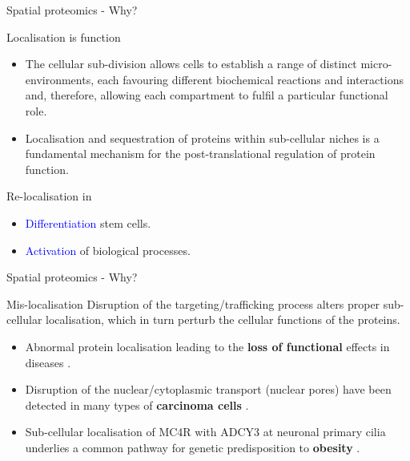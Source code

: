 \begin{frame}{Spatial proteomics - Why?}
  \begin{block}{Localisation is function}
    \begin{itemize}
    \item The cellular sub-division allows cells to establish a range
      of distinct micro-environments, each favouring different
      biochemical reactions and interactions and, therefore, allowing
      each compartment to fulfil a particular functional role.
    \item Localisation and sequestration of proteins within
      sub-cellular niches is a fundamental mechanism for the
      post-translational regulation of protein function.
    \end{itemize}
  \end{block}
  \begin{block}{Re-localisation in}
    \begin{itemize}
    \item \textcolor{Blue}{Differentiation} stem cells.
    \item \textcolor{Blue}{Activation} of biological processes.
    \end{itemize}
  \end{block}
\end{frame}

\begin{frame}{Spatial proteomics - Why?}
  \begin{block}{Mis-localisation}
    Disruption of the targeting/trafficking process alters proper
    sub-cellular localisation, which in turn perturb the cellular
    functions of the proteins.
    \begin{itemize}
    \item Abnormal protein localisation leading to the \textbf{loss of
        functional} effects in diseases \citep{Laurila2009}.
    \item Disruption of the nuclear/cytoplasmic transport (nuclear
      pores) have been detected in many types of \textbf{carcinoma
        cells} \citep{Kau2004}.
    \item Sub-cellular localisation of MC4R with ADCY3 at neuronal
      primary cilia underlies a common pathway for genetic
      predisposition to \textbf{obesity} \citep{Siljee:2018}.
    \end{itemize}
  \end{block}

\end{frame}


